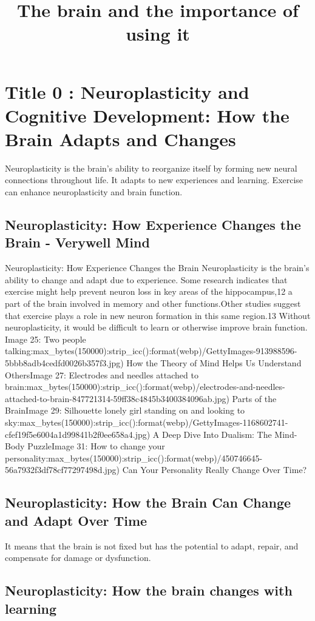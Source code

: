 \documentclass[12pt]{article}
\title{The brain and the importance of using it}
\author{}
\date{}
\begin{document}
\maketitle

\section{Title 0 : Neuroplasticity and Cognitive Development: How the Brain Adapts and Changes}
Neuroplasticity is the brain's ability to reorganize itself by forming new neural connections throughout life. It adapts to new experiences and learning. Exercise can enhance neuroplasticity and brain function.\subsection{Neuroplasticity: How Experience Changes the Brain - Verywell Mind}
Neuroplasticity: How Experience Changes the Brain Neuroplasticity is the brain's ability to change and adapt due to experience. Some research indicates that exercise might help prevent neuron loss in key areas of the hippocampus,12 a part of the brain involved in memory and other functions.Other studies suggest that exercise plays a role in new neuron formation in this same region.13 Without neuroplasticity, it would be difficult to learn or otherwise improve brain function. Image 25: Two people talking:max\_bytes(150000):strip\_icc():format(webp)/GettyImages-913988596-5bbb8adb4cedfd0026b357f3.jpg) How the Theory of Mind Helps Us Understand OthersImage 27: Electrodes and needles attached to brain:max\_bytes(150000):strip\_icc():format(webp)/electrodes-and-needles-attached-to-brain-847721314-59ff38c4845b3400384096ab.jpg) Parts of the BrainImage 29: Silhouette lonely girl standing on and looking to sky:max\_bytes(150000):strip\_icc():format(webp)/GettyImages-1168602741-cfef19f5e6004a1d99841b2f0ee658a4.jpg) A Deep Dive Into Dualism: The Mind-Body PuzzleImage 31: How to change your personality:max\_bytes(150000):strip\_icc():format(webp)/450746645-56a7932f3df78cf77297498d.jpg) Can Your Personality Really Change Over Time?\subsection{Neuroplasticity: How the Brain Can Change and Adapt Over Time}
It means that the brain is not fixed but has the potential to adapt, repair, and compensate for damage or dysfunction.\subsection{Neuroplasticity: How the brain changes with learning}
\end{document}
